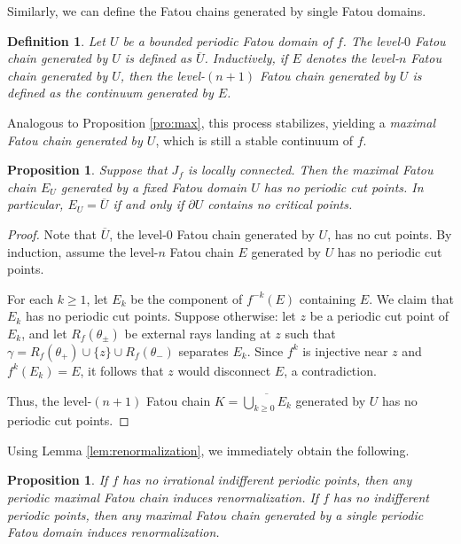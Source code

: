 \documentclass[a4paper,reqno,times, 11pt]{amsart}
\newtheorem{proposition}[theorem]{Proposition}
\newtheorem{definition}[theorem]{Definition}
\theoremstyle{remark}
\theoremstyle{plain}
\numberwithin{equation}{section}
\begin{document}
	Similarly, we  can  define the   Fatou chains generated by  single Fatou domains.
	
	\begin{definition}\label{def:chain}
		Let $U$ be a bounded periodic Fatou domain of $f$. The level-$0$ Fatou chain generated by $U$ is defined as $\overline{U}$. Inductively, if $E$ denotes the level-$n$ Fatou chain generated by $U$, then the level-$(n+1)$ Fatou chain generated by $U$ is defined as the continuum generated by $E$.
	\end{definition}
	
	Analogous to Proposition \ref{pro:max}, this process stabilizes, yielding a \emph{maximal Fatou chain generated by $U$}, which is still a stable continuum of $f$.
	
	\begin{proposition}\label{pro:chain1}
		Suppose that $J_f$ is locally connected. Then the maximal Fatou chain $E_U$ generated by a fixed Fatou domain $U$ has no periodic cut points. In particular, $E_U=\overline{U}$ if and only if $\partial U$ contains no critical points.
	\end{proposition}
	\begin{proof}
		Note that $\overline{U}$, the level-$0$ Fatou chain generated by $U$, has no cut points. By induction, assume the level-$n$ Fatou chain $E$ generated by $U$ has no periodic cut points.
		
		For each $k \geq 1$, let $E_k$ be the component of $f^{-k}(E)$ containing $E$.
		We claim that $E_k$ has no periodic cut points.
		Suppose otherwise: let $z$ be a periodic cut point of $E_k$, and let $R_f(\theta_\pm)$ be external rays landing at $z$ such that $\gamma = R_f(\theta_+) \cup \{z\} \cup R_f(\theta_-)$ separates $E_k$. Since $f^k$ is injective near $z$ and $f^k(E_k) = E$, it follows that $z$ would disconnect $E$, a contradiction.
		
		Thus, the level-$(n+1)$ Fatou chain $K = \overline{\bigcup_{k \geq 0} E_k}$ generated by $U$ has no periodic cut points.
	\end{proof}
	
	Using Lemma \ref{lem:renormalization}, we immediately obtain the following.
	
	\begin{proposition}\label{pro:renormalization}
		If $f$ has no irrational indifferent periodic points, then any periodic maximal Fatou chain induces  renormalization. If $f$ has no indifferent periodic points, then  any maximal Fatou chain generated by a single periodic Fatou domain induces renormalization.
	\end{proposition}
	
\end{document}

